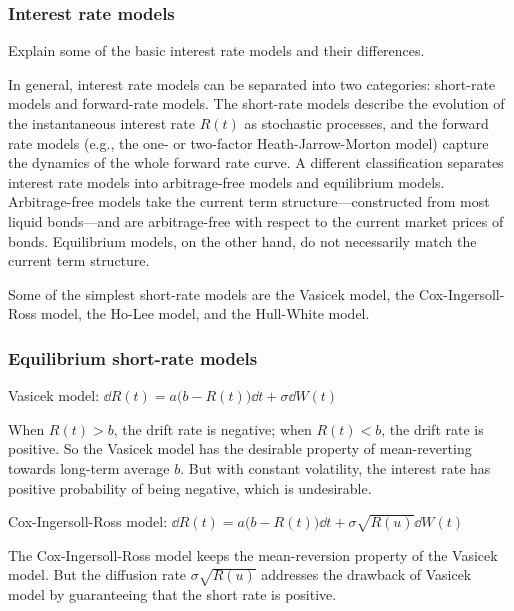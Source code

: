 \subsubsection*{Interest rate models}

\begin{problem}{Explain some of the basic interest rate models and their differences.}
\end{problem}

\begin{solution}
In general, interest rate models can be separated into two categories: short-rate
models and forward-rate models. The short-rate models describe the evolution of the
instantaneous interest rate $R(t)$ as stochastic processes, and the forward rate models
(e.g., the one- or two-factor Heath-Jarrow-Morton model) capture the dynamics of the
whole forward rate curve. A different classification separates interest rate models into
arbitrage-free models and equilibrium models. Arbitrage-free models take the current
term structure---constructed from most liquid bonds---and are arbitrage-free with respect
to the current market prices of bonds. Equilibrium models, on the other hand, do not
necessarily match the current term structure.

Some of the simplest short-rate models are the Vasicek model, the Cox-Ingersoll-Ross
model, the Ho-Lee model, and the Hull-White model.

\subsubsection*{Equilibrium short-rate models}

Vasicek model: $\dd R(t)=a\bigl(b-R(t)\bigr)\dd t+\sigma\dd W(t)$

When $R(t)>b$, the drift rate is negative; when $R(t)<b$, the drift rate is positive. So the
Vasicek model has the desirable property of mean-reverting towards long-term average
$b$. But with constant volatility, the interest rate has positive probability of being negative,
which is undesirable.

Cox-Ingersoll-Ross model: $\dd R(t)=a\bigl(b-R(t)\bigr)\dd t+\sigma\sqrt{R(u)}\dd W(t)$


The Cox-Ingersoll-Ross model keeps the mean-reversion property of the Vasicek model.
But the diffusion rate $\sigma\sqrt{R(u)}$ addresses the drawback of Vasicek model by
guaranteeing that the short rate is positive.


\end{solution}
